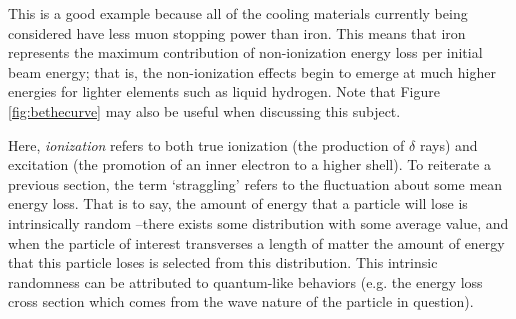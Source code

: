 This is a good example because all of the cooling materials currently being considered have less muon stopping power than iron. This means that iron represents the maximum contribution of non-ionization energy loss per initial beam energy; that is, the non-ionization effects begin to emerge at much higher energies for lighter elements such as liquid hydrogen. Note that Figure \ref{fig:bethecurve} may also be useful when discussing this subject.

Here, \textit{ionization} refers to both true ionization (the production of $\delta$ rays) and excitation (the promotion of an inner electron to a higher shell). To reiterate a previous section, the term `straggling' refers to the fluctuation about some mean energy loss. That is to say, the amount of energy that a particle will lose is intrinsically random --there exists some distribution with some average value, and when the particle of interest transverses a length of matter the amount of energy that this particle loses is selected from this distribution. This intrinsic randomness can be attributed to quantum-like behaviors (e.g. the energy loss cross section which comes from the wave nature of the particle in question).
